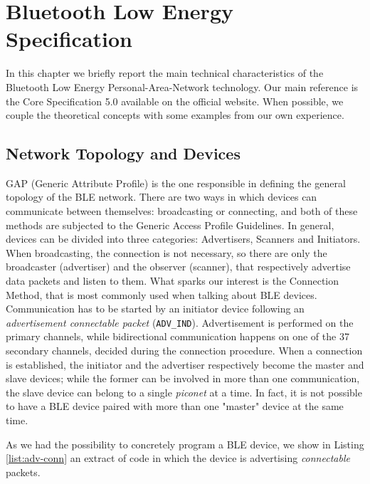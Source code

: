 \chapter{Bluetooth Low Energy Specification}
\label{chapter2}
\thispagestyle{empty}

\noindent In this chapter we briefly report the main technical characteristics of the Bluetooth Low Energy Personal-Area-Network technology. Our main reference is the Core Specification 5.0 available on the official website. When possible, we couple the theoretical concepts with some examples from our own experience.

\section{Network Topology and Devices}
GAP (Generic Attribute Profile) is the one responsible in defining the general topology of the BLE network.
There are two ways in which devices can communicate between themselves: broadcasting or connecting, and both of these methods are subjected to the Generic Access Profile Guidelines.
In general, devices can be divided into three categories: Advertisers, Scanners and Initiators. 
When broadcasting, the connection is not necessary, so there are only the broadcaster (advertiser) and the observer (scanner), that respectively advertise data packets and listen to them.
What sparks our interest is the Connection Method, that is most commonly used when talking about BLE devices.
Communication has to be started by an initiator device following an \textit{advertisement connectable packet} (\texttt{ADV\_IND}). Advertisement is performed on the primary channels, while bidirectional communication happens on one of the 37 secondary channels, decided during the connection procedure. When a connection is established, the initiator and the advertiser respectively become the master and slave devices; while the former can be involved in more than one communication, the slave device can belong to a single \textit{piconet} at a time. In fact, it is not possible to have a BLE device paired with more than one "master" device at the same time.

As we had the possibility to concretely program a BLE device, we show in Listing \ref{list:adv-conn} an extract of code in which the device is advertising \textit{connectable} packets.


